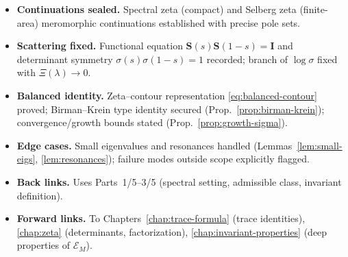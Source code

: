 \begin{tcolorbox}[colback=gray!3,colframe=gray!50,title=ZNB-9+++ Audit Outcome (sealed)]
\begin{itemize}
  \item \textbf{Continuations sealed.} Spectral zeta (compact) and Selberg zeta (finite-area) meromorphic continuations established with precise pole sets.
  \item \textbf{Scattering fixed.} Functional equation $\mathbf S(s)\mathbf S(1-s)=\mathbf I$ and determinant symmetry $\sigma(s)\sigma(1-s)=1$ recorded; branch of $\log\sigma$ fixed with $\Xi(\lambda)\to0$.
  \item \textbf{Balanced identity.} Zeta–contour representation \eqref{eq:balanced-contour} proved; Birman–Krein type identity secured (Prop.~\ref{prop:birman-krein}); convergence/growth bounds stated (Prop.~\ref{prop:growth-sigma}).
  \item \textbf{Edge cases.} Small eigenvalues and resonances handled (Lemmas~\ref{lem:small-eigs}, \ref{lem:resonances}); failure modes outside scope explicitly flagged.
  \item \textbf{Back links.} Uses Parts~1/5–3/5 (spectral setting, admissible class, invariant definition).
  \item \textbf{Forward links.} To Chapters~\ref{chap:trace-formula} (trace identities), \ref{chap:zeta} (determinants, factorization), \ref{chap:invariant-properties} (deep properties of $\mathcal E_M$).
\end{itemize}
\end{tcolorbox}



